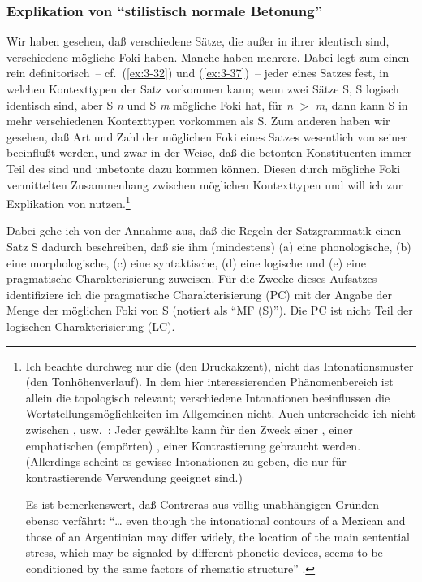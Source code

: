 \documentclass[output=paper]{langsci/langscibook}
\begin{document}
\subsubsection{Explikation von "`stilistisch normale Betonung"'}
\label{subsubsec:3-1-3-3}

Wir haben gesehen, daß verschiedene Sätze, die außer in ihrer 
identisch sind, verschiedene mögliche Foki haben. Manche haben
mehrere. Dabei legt zum einen rein definitorisch~-- cf.\ (\ref{ex:3-32}) und
(\ref{ex:3-37})~-- jeder  eines Satzes fest, in welchen Kontexttypen der
Satz vorkommen kann; wenn zwei Sätze S, S logisch identisch sind,
aber S \textit{n} und S \textit{m} mögliche Foki hat, für \textit{n} $>$ \textit{m}, dann kann
S in mehr verschiedenen Kontexttypen vorkommen als S. Zum
anderen haben wir gesehen, daß Art und Zahl der möglichen Foki eines
Satzes wesentlich von seiner  beeinflußt werden, und zwar in
der Weise, daß die betonten Konstituenten immer Teil des  sind
und unbetonte dazu kommen können. Diesen durch mögliche Foki
vermittelten Zusammenhang zwischen möglichen Kontexttypen und 
will ich zur Explikation von 
nutzen.\footnote{\label{fn:3-16}%
	Ich beachte durchweg nur die  (den Druckakzent), nicht das
  Intonationsmuster (den Tonhöhenverlauf). In dem hier interessierenden
  Phänomenbereich ist allein die  topologisch relevant;
  verschiedene Intonationen beeinflussen die Wortstellungsmöglichkeiten
  im Allgemeinen nicht. Auch unterscheide ich nicht zwischen
  ,  usw.\ : Jeder
  gewählte  kann für den Zweck einer ,
  einer emphatischen (\zb empörten) , einer
  Kontrastierung gebraucht werden. (Allerdings scheint es gewisse
  Intonationen zu geben, die nur für kontrastierende Verwendung geeignet
  sind.)

  Es ist bemerkenswert, daß Contreras aus völlig unabhängigen Gründen
  ebenso verfährt: "`\ldots{} even though the intonational contours of a
  Mexican and those of an Argentinian may differ widely, the location of
  the main sentential stress, which may be signaled by different
  phonetic devices, seems to be conditioned by the same factors of
  rhematic structure"' \citep[105]{Contreras76}.%
}

Dabei gehe ich von der Annahme aus, daß die Regeln der Satzgrammatik
einen Satz S dadurch beschreiben, daß sie ihm (mindestens) (a)
eine phonologische, (b) eine morphologische, (c) eine syntaktische,
  (d) eine logische und (e) eine pragmatische Charakterisierung
  zuweisen. Für die Zwecke dieses Aufsatzes identifiziere ich die
  pragmatische Charakterisierung (PC) mit der Angabe der Menge der
  möglichen Foki von S (notiert als "`MF (S)"'). Die PC ist nicht
  Teil der logischen Charakterisierung (LC).
\end{document}
